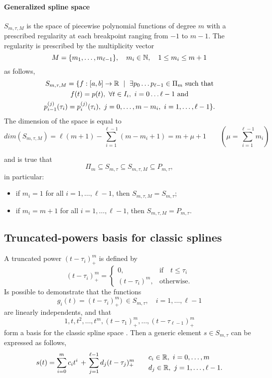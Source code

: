 \documentclass[dissertation.tex]{subfiles}
\begin{document}
\paragraph{Generalized spline space} $S_{m,\tau,M}$ is the
space of piecewise polynomial functions of degree $m$ with a prescribed
regularity at each breakpoint ranging from $-1$ to $m-1$. The
regularity is prescribed by the multiplicity vector
$$
M=\{m_1,\dots,m_{\ell-1}\},\quad m_i\in\mathbb{N},\quad 1\leq m_i\leq m+1
$$
as follows,
\begin{multline*}
  S_{m,\tau,M}=\{f:[a,b]\rightarrow\mR\ \mid\ \exists p_0\dots
  p_{\ell-1}\in\Pi_m \ \text{such that}\\
  f(t)=p(t),\ \forall t\in I_i,\
  i=0\dots \ell-1\ \text{and}\\
  p_{i-1}^{(j)}(\tau_i)=p_{i}^{(j)}(\tau_i),\ j=0,\dots,m-m_i,\ i=1,\dots,\ell-1\}.
\end{multline*}
The dimension of the space is equal to 
\begin{equation*}
  dim(S_{m,\tau,M})=\ell(m+1)-\sum_{i=1}^{\ell-1}(m-m_i+1)=m+\mu +1\qquad(\mu=\sum_{i=1}^{\ell-1}m_i)  
\end{equation*}

and is true that
$$
\Pi_m\subseteq S_{m,\tau}\subseteq S_{m,\tau,M}\subseteq P_{m,\tau},
$$
in particular:
\begin{itemize}
  \item if $m_i=1$ for all $i=1,\dots,\ell-1$, then
    $S_{m,\tau,M}=S_{m,\tau}$;
  \item if $m_i=m+1$ for all $i=1,\dots,\ell-1$, then
    $S_{m,\tau,M}=P_{m,\tau}$.
\end{itemize}

\subsection{Truncated-powers basis for classic
  splines}\label{sec:truncpow}
A truncated power $(t-\tau_i)_+^m$ is
defined by
$$
(t-\tau_i)_+^m=
\begin{cases}
  0,&\mbox{if}\quad t\leq\tau_i\\
  (t-\tau_i)^m, &\mbox{otherwise}.
\end{cases}
$$
Is possible to demonstrate that the functions
$$
g_i(t)=(t-\tau_i)_+^m)\ \in S_{m,\tau},\quad i=1,\dots,\ell-1
$$
are linearly independents, and that
$$
1,t,t^2,\dots,t^m,(t-\tau_1)_+^m,\dots,(t-\tau_{\ell-1})_+^m
$$
form a basis for the classic spline space \cite{deboor}. Then a
generic element $s\in S_{m,\tau}$ can be expressed as follows,
\begin{equation}\label{eq:classicSplineElement}
  s(t)=\sum_{i=0}^m c_i t^i\, +\, \sum_{j=1}^{\ell-1} d_j
  (t-\tau_j)_+^m\qquad
  \begin{split}
    &c_i\in\mathbb{R},\ i=0,\dots,m\\
    &d_j\in\mathbb{R},\ j=1,\dots,\ell-1.
  \end{split}
\end{equation}
\end{document}
